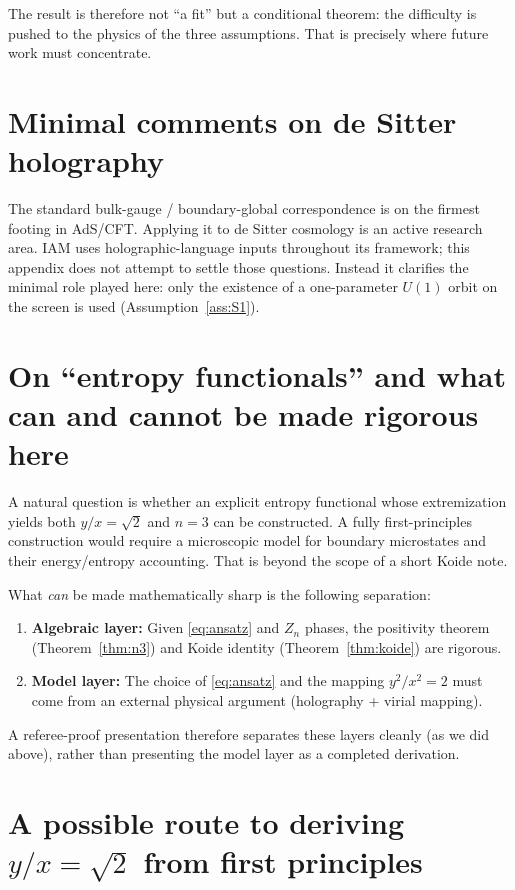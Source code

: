\documentclass[12pt,a4paper]{article}
\begin{document}
The result is therefore not ``a fit'' but a conditional theorem: the difficulty is pushed to the physics of the three assumptions.
That is precisely where future work must concentrate.

\appendix

\section{Minimal comments on de Sitter holography}
\label{app:dS}

The standard bulk-gauge / boundary-global correspondence is on the firmest footing in AdS/CFT.
Applying it to de Sitter cosmology is an active research area.
IAM uses holographic-language inputs throughout its framework; this appendix does not attempt to settle those questions.
Instead it clarifies the minimal role played here: only the existence of a one-parameter $U(1)$ orbit on the screen is used (Assumption~\ref{ass:S1}).

\section{On ``entropy functionals'' and what can and cannot be made rigorous here}
\label{app:functional}

A natural question is whether an explicit entropy functional whose extremization yields both $y/x=\sqrt{2}$ and $n=3$ can be constructed.
A fully first-principles construction would require a microscopic model for boundary microstates and their energy/entropy accounting.
That is beyond the scope of a short Koide note.

What \emph{can} be made mathematically sharp is the following separation:
\begin{enumerate}
\item \textbf{Algebraic layer:} Given \eqref{eq:ansatz} and $Z_n$ phases, the positivity theorem (Theorem~\ref{thm:n3}) and Koide identity (Theorem~\ref{thm:koide}) are rigorous.
\item \textbf{Model layer:} The choice of \eqref{eq:ansatz} and the mapping $y^2/x^2=2$ must come from an external physical argument (holography + virial mapping).
\end{enumerate}

A referee-proof presentation therefore separates these layers cleanly (as we did above), rather than presenting the model layer as a completed derivation.

\section{A possible route to deriving $y/x=\sqrt{2}$ from first principles}
\label{app:weyl}
\end{document}
